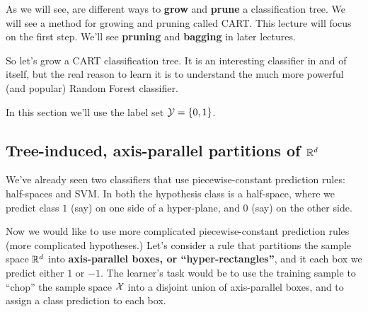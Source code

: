 \documentclass[11pt]{article}
\begin{document}
  As we will see,  are different ways to {\bf grow} and {\bf prune} a
  classification tree. We will see a method for growing and pruning called CART.
  This lecture will focus on the first step. We'll see {\bf pruning} and {\bf bagging} in later lectures.
 
  So let's grow a CART classification tree. It is an interesting classifier in and of itself,
  but the real reason to learn it is to understand the much more powerful (and
  popular) Random
  Forest classifier. 

  In this section we'll use the label set $\mathcal{Y}=\left\{ 0,1 \right\}$.

  \subsection{Tree-induced,  axis-parallel partitions of $\mathbb{R}^d$}

 We've already seen two classifiers that use piecewise-constant prediction
 rules: half-spaces and SVM. In both the hypothesis class is a half-space, where
 we predict class $1$ (say) on one side of a hyper-plane, and $0$ (say) on the
 other side. 

 Now we would like to use more complicated piecewise-constant prediction rules
 (more complicated hypotheses.) Let's consider a rule that partitions the
 sample space $\mathbb{R}^d$ into {\bf axis-parallel boxes, or ``hyper-rectangles''}, and it each
 box we predict either $1$ or $-1$. The learner's task would be to use the
 training sample to 
 ``chop'' the sample space $\mathcal{X}$ into a disjoint union of axis-parallel boxes, and
 to assign a class prediction to each box. 
\end{document}
